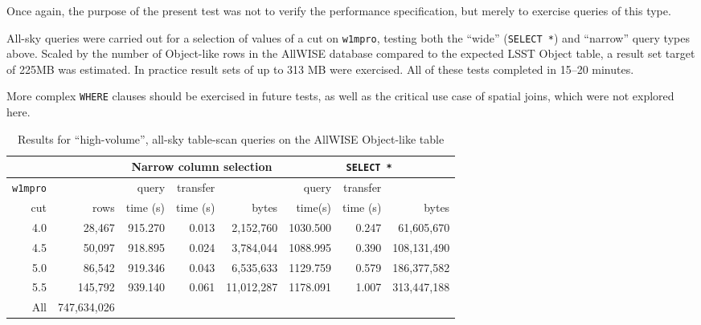 Once again, the purpose of the present test was not to verify the performance specification,
but merely to exercise queries of this type.

All-sky queries were carried out for a selection of values of a cut on \verb|w1mpro|,
testing both the ``wide'' (\texttt{SELECT *}) and ``narrow'' query types above.
Scaled by the number of Object-like rows in the AllWISE database compared to the expected LSST Object table,
a result set target of 225MB was estimated.
In practice result sets of up to 313 MB were exercised.
All of these tests completed in 15--20 minutes.

More complex \verb|WHERE| clauses should be exercised in future tests,
as well as the critical use case of spatial joins, which were not explored here.

\begin{table}[h]
\centering
\begin{tabular}{r r r r r r r r}
 & & \multicolumn{3}{c}{Narrow column selection} & \multicolumn{3}{c}{\texttt{SELECT *}} \\ \hline
\texttt{w1mpro} &  & query & transfer &  & query & transfer &  \\
cut & rows & time (s) & time (s) & bytes & time(s) & time (s) & bytes \\ \hline
4.0 & 28,467 & 915.270 & 0.013 & 2,152,760 & 1030.500 & 0.247 & 61,605,670 \\
4.5 & 50,097 & 918.895 & 0.024 & 3,784,044 & 1088.995 & 0.390 & 108,131,490 \\
5.0 & 86,542 & 919.346 & 0.043 & 6,535,633 & 1129.759 & 0.579 & 186,377,582 \\
5.5 & 145,792 & 939.140 & 0.061 & 11,012,287 & 1178.091 & 1.007 & 313,447,188 \\
All & 747,634,026 \\
\end{tabular}
\caption{Results for ``high-volume'', all-sky table-scan queries on the AllWISE Object-like table}
\label{tab:lsp-00-10-all-sky-scans}
\end{table}
